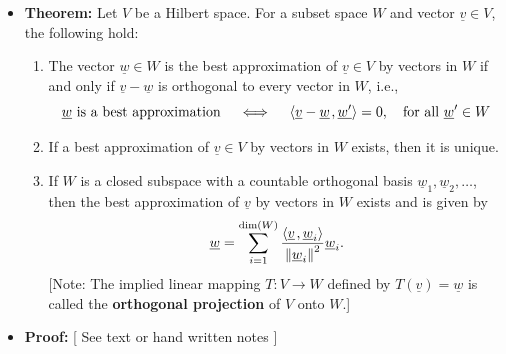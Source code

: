 \documentclass[11pt,twoside]{report}
\newcommand{\vecnot}{\underline}
\newcommand{\inner}[2]{{\left\langle #1 \mskip2mu , #2 \right\rangle}}
\begin{document}
\begin{itemize}
\item \textbf{Theorem:} Let $V$ be a Hilbert space. For a subset space $W$ and vector $\vecnot{v} \in V$, the following hold: %

\begin{enumerate}[(1)]

\item  The vector $\vecnot{w} \in W$ is the best approximation of $\vecnot{v} \in V$ by vectors in $W$ if and only if $\vecnot{v} - \vecnot{w}$ is orthogonal to every vector in $W$, i.e., 
\[
\text{$ \vecnot{w}$ is a best approximation} \quad \iff \quad \inner{ \vecnot{v} - \vecnot{w}}{ \vecnot{w'} } = 0 , \quad \text{for all $\vecnot{w}' \in W$}
\] 

\item If a best approximation of $\vecnot{v} \in V$  by vectors in $W$ exists, then it is unique.


\item If $W$ is a closed subspace with a countable orthogonal basis $\vecnot{w}_1, \vecnot{w}_2, \ldots$, then the best approximation of $\vecnot{v}$ by vectors in $W$ exists and is given by
\begin{equation*}
\vecnot{w} = \sum_{i=1}^{\dim (W)} \frac{ \inner{ \vecnot{v} }{ \vecnot{w}_i } }{ \left\| \vecnot{w}_i \right\|^2 } \vecnot{w}_i . 
\end{equation*}
[Note: The implied linear mapping $T \colon V \to W$ defined by $T(\vecnot{v}) = \vecnot{w}$ is called the \textbf{orthogonal projection} of $V$ onto $W$.]
\end{enumerate}


\item \textbf{Proof:} 
\color{blue}
[ See text or hand written notes ]
\color{black} 


\end{itemize}
\end{document}
